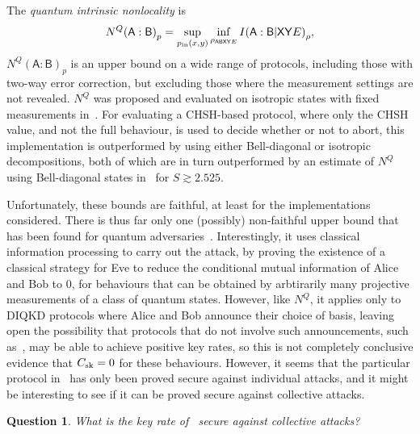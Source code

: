 \documentclass[10pt, a4paper]{article}
\numberwithin{equation}{section} %
\theoremstyle{definition}
\theoremstyle{plain}
\newtheorem{question}{Question}
\newcommand{\?}{\mathrel{?}} %
\newcommand{\crv}[1]{\mathsf{#1}}
\newcommand{\sk}{\rm sk}
\begin{document}

      The \emph{quantum intrinsic nonlocality} is~\cite{DIQKD_Limits}
      \begin{equation}
        N^Q{(\crv{A}:\crv{B})}_p = \sup_{p_{\rm in}(x,y)} \inf_{\rho_{\crv{ABXY}E}} I{(\crv{A}:\crv{B}|\crv{XY}E)}_{\rho},
      \end{equation}
       \(N^Q{(\crv{A}:\crv{B})}_p\) is an upper bound on a wide range of protocols, including those with two-way error correction, but excluding those where the measurement settings are not revealed. \(N^Q\) was proposed and evaluated on isotropic states with fixed measurements in~\cite{DIQKD_Limits}. For evaluating a CHSH-based protocol, where only the CHSH value, and not the full behaviour, is used to decide whether or not to abort, this implementation is outperformed by  using either Bell-diagonal or isotropic decompositions, both of which are in turn outperformed by an estimate of \(N^Q\) using Bell-diagonal states in~\cite[Appendix B]{RevisedPeres} for \(S \gtrsim 2.525\).

      Unfortunately, these bounds are faithful, at least for the implementations considered. There is thus far only one (possibly) non-faithful upper bound that has been found for quantum adversaries~\cite{NotSufficient}. Interestingly, it uses classical information processing to carry out the attack, by proving the existence of a classical strategy for Eve to reduce the conditional mutual information of Alice and Bob to 0, for behaviours that can be obtained by arbtirarily many projective measurements of a class of quantum states. However, like \(N^Q\), it applies only to DIQKD protocols where Alice and Bob announce their choice of basis, leaving open the possibility that protocols that do not involve such announcements, such as~\cite{NonstandardProtocol}, may be able to achieve positive key rates, so this is not completely conclusive evidence that \(C_{\sk} = 0\) for these behaviours. However, it seems that the particular protocol in~\cite{NonstandardProtocol} has only been proved secure against individual attacks, and it might be interesting to see if it can be proved secure against collective attacks.

      \begin{question}
        What is the key rate of~\cite{NonstandardProtocol} secure against collective attacks?
      \end{question}
\end{document}
